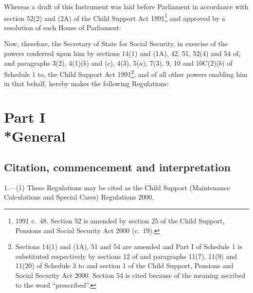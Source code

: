 \documentclass[12pt,a4paper]{article}
\title{\regstitle}
\author{S.I. 2001 No. 155}
\date{Made 18th January 2001\\
Coming into force in accordance with regulation 1(4) and (5)
}
\begin{document}
\maketitle

\noindent
Whereas a draft of this Instrument was laid before Parliament in accordance with section 52(2) and (2A) of the Child Support Act 1991\footnote{1991 c.\ 48. Section 52 is amended by section 25 of the Child Support, Pensions and Social Security Act 2000 (c.\ 19).} and approved by a resolution of each House of Parliament:

Now, therefore, the Secretary of State for Social Security, in exercise of the powers conferred upon him by sections 14(1) and (1A), 42, 51, 52(4) and 54 of, and paragraphs 3(2), 4(1)($b$)  and ($c$), 4(3), 5($a$), 7(3), 9, 10 and 10C(2)($b$)  of Schedule 1 to, the Child Support Act 1991\footnote{Sections 14(1) and (1A), 51 and 54 are amended and Part I of Schedule 1 is substituted respectively by sections 12 of and paragraphs 11(7), 11(9) and 11(20) of Schedule 3 to and section 1 of the Child Support, Pensions and Social Security Act 2000. Section 54 is cited because of the meaning ascribed to the word “prescribed”.}, and of all other powers enabling him in that behalf, hereby makes the following Regulations: 

\enlargethispage{\baselineskip}

{\sloppy

\tableofcontents

}

\bigskip

\setcounter{secnumdepth}{-2}

\section[Part I --- General]{Part I\\*General}

\renewcommand\parthead{--- Part I}

\subsection[1. Citation, commencement and interpretation]{Citation, commencement and interpretation}

1.---(1)  These Regulations may be cited as the Child Support (Maintenance Calculations and Special Cases) Regulations 2000.
\end{document}
